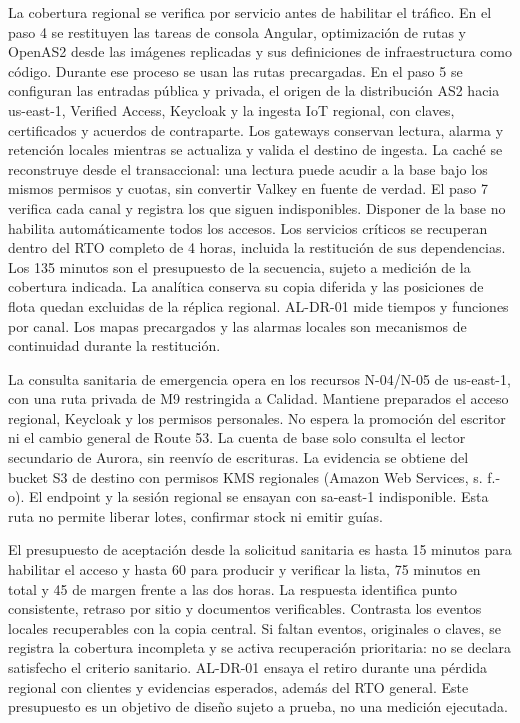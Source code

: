 La cobertura regional se verifica por servicio antes de habilitar el tráfico. En el paso 4 se restituyen las tareas de consola Angular, optimización de rutas y OpenAS2 desde las imágenes replicadas y sus definiciones de infraestructura como código. Durante ese proceso se usan las rutas precargadas. En el paso 5 se configuran las entradas pública y privada, el origen de la distribución AS2 hacia us-east-1, Verified Access, Keycloak y la ingesta IoT regional, con claves, certificados y acuerdos de contraparte. Los gateways conservan lectura, alarma y retención locales mientras se actualiza y valida el destino de ingesta. La caché se reconstruye desde el transaccional: una lectura puede acudir a la base bajo los mismos permisos y cuotas, sin convertir Valkey en fuente de verdad. El paso 7 verifica cada canal y registra los que siguen indisponibles. Disponer de la base no habilita automáticamente todos los accesos. Los servicios críticos se recuperan dentro del RTO completo de 4 horas, incluida la restitución de sus dependencias. Los 135 minutos son el presupuesto de la secuencia, sujeto a medición de la cobertura indicada. La analítica conserva su copia diferida y las posiciones de flota quedan excluidas de la réplica regional. AL-DR-01 mide tiempos y funciones por canal. Los mapas precargados y las alarmas locales son mecanismos de continuidad durante la restitución.

La consulta sanitaria de emergencia opera en los recursos N-04/N-05 de us-east-1, con una ruta privada de M9 restringida a Calidad. Mantiene preparados el acceso regional, Keycloak y los permisos personales. No espera la promoción del escritor ni el cambio general de Route 53. La cuenta de base solo consulta el lector secundario de Aurora, sin reenvío de escrituras. La evidencia se obtiene del bucket S3 de destino con permisos KMS regionales (Amazon Web Services, s. f.-o). El endpoint y la sesión regional se ensayan con sa-east-1 indisponible. Esta ruta no permite liberar lotes, confirmar stock ni emitir guías.

El presupuesto de aceptación desde la solicitud sanitaria es hasta 15 minutos para habilitar el acceso y hasta 60 para producir y verificar la lista, 75 minutos en total y 45 de margen frente a las dos horas. La respuesta identifica punto consistente, retraso por sitio y documentos verificables. Contrasta los eventos locales recuperables con la copia central. Si faltan eventos, originales o claves, se registra la cobertura incompleta y se activa recuperación prioritaria: no se declara satisfecho el criterio sanitario. AL-DR-01 ensaya el retiro durante una pérdida regional con clientes y evidencias esperados, además del RTO general. Este presupuesto es un objetivo de diseño sujeto a prueba, no una medición ejecutada.

